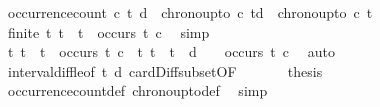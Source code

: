 \begin{isabellebody}
\isanewline
{}\isamarkupfalse%
\ {\isacartoucheopen}occurrence{\isacharunderscore}count\ c\ {\isacharparenleft}t\ {\isacharparenleft}d{\isacharplus}{}{\isacharparenright}\ {\isacharequal}\ chrono{\isacharunderscore}up{\isacharunderscore}to\ c\ {\isacharparenleft}td{\isacharplus}{}{\isacharparenright}\ {\isacharminus}\ chrono{\isacharunderscore}up{\isacharunderscore}to\ c\ t\isanewline
%
\isadelimproof
%
\endisadelimproof
%
\isatagproof
{}\isamarkupfalse%
\ {\isacharminus}\isanewline
\ \ \isamarkupfalse%
\ {}{\isacharcolon}{\isacartoucheopen}finite\ {\isacharbraceleft}t{\isachardot}\ t\ {\isasymle}\ t\ {\isasymand}\ occurs\ t\ c{\isacharbraceright}{\isacartoucheclose}\ \isamarkupfalse%
\ simp\isanewline
\ \ \isamarkupfalse%
\ {}{\isacharcolon}{\isacartoucheopen}{\isacharbraceleft}t{\isachardot}\ t\ {\isasymle}\ t\ {\isasymand}\ occurs\ t\ c{\isacharbraceright}\ {\isasymsubseteq}\ {\isacharbraceleft}t{\isachardot}\ t\ {\isasymle}\ t\ {\isacharplus}\ d\ {\isacharplus}\ {}\ {\isasymand}\ occurs\ t\ c{\isacharbraceright}{\isacartoucheclose}\ \isamarkupfalse%
\ auto\isanewline
\ \ \isamarkupfalse%
\ interval{\isacharunderscore}diff{\isacharunderscore}le{\isacharbrackleft}of\ {\isacartoucheopen}t\ {\isacartoucheopen}d{\isacartoucheclose}{\isacharbrackright}\ card{\isacharunderscore}Diff{\isacharunderscore}subset{\isacharbrackleft}OF\ {}\ {}{\isacharbrackright}\ \isanewline
\ \ \isamarkupfalse%
\ {\isacharquery}thesis\ \isamarkupfalse%
\ occurrence{\isacharunderscore}count{\isacharunderscore}def\ chrono{\isacharunderscore}up{\isacharunderscore}to{\isacharunderscore}def\ \isamarkupfalse%
\ simp\isanewline
{}\isamarkupfalse%
%
\endisatagproof
{\isafoldproof}%
%
\isadelimproof
\isanewline
%
\endisadelimproof
%
\isadelimtheory
\isanewline
%
\endisadelimtheory
%
\isatagtheory
{}\isamarkupfalse%
%
\endisatagtheory
{\isafoldtheory}%
%
\isadelimtheory
%
\endisadelimtheory
%
\end{isabellebody}%
\endinput
